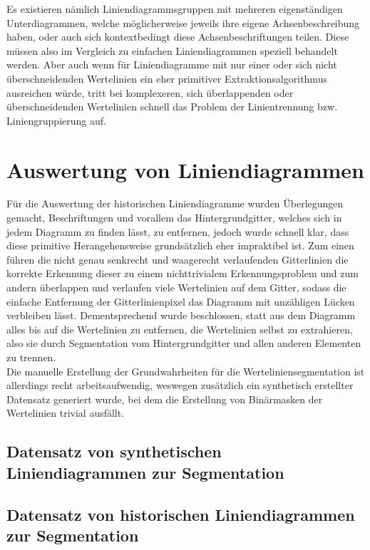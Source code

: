 Es existieren nämlich Liniendiagrammsgruppen mit mehreren eigenständigen Unterdiagrammen, welche möglicherweise jeweils ihre eigene Achsenbeschreibung haben, oder auch sich kontextbedingt diese Achsenbeschriftungen teilen. Diese müssen also im Vergleich zu einfachen Liniendiagrammen speziell behandelt werden. Aber auch wenn für Liniendiagramme mit nur einer oder sich nicht überschneidenden Wertelinien ein eher primitiver Extraktionsalgorithmus ausreichen würde, tritt bei komplexeren, sich überlappenden oder überschneidenden Wertelinien schnell das Problem der Linientrennung bzw. Liniengruppierung auf.

\clearpage

\section{Auswertung von Liniendiagrammen}

Für die Auswertung der historischen Liniendiagramme wurden Überlegungen gemacht, Beschriftungen und vorallem das Hintergrundgitter, welches sich in jedem Diagramm zu finden lässt, zu entfernen, jedoch wurde schnell klar, dass diese primitive Herangehensweise grundsätzlich eher impraktibel ist. Zum einen führen die nicht genau senkrecht und waagerecht verlaufenden Gitterlinien die korrekte Erkennung dieser zu einem nichttrivialem Erkennungsproblem und zum andern überlappen und verlaufen viele Wertelinien auf dem Gitter, sodass die einfache Entfernung der Gitterlinienpixel das Diagramm mit unzähligen Lücken verbleiben lässt. Dementsprechend wurde beschlossen, statt aus dem Diagramm alles bis auf die Wertelinien zu entfernen, die Wertelinien selbst zu extrahieren, also sie durch Segmentation vom Hintergrundgitter und allen anderen Elementen zu trennen.
\\
Die manuelle Erstellung der Grundwahrheiten für die Werteliniensegmentation ist allerdings recht arbeitsaufwendig, weswegen zusätzlich ein synthetisch erstellter Datensatz generiert wurde, bei dem die Erstellung von Binärmasken der Wertelinien trivial ausfällt.

\subsection{Datensatz von synthetischen Liniendiagrammen zur Segmentation}

\subsection{Datensatz von historischen Liniendiagrammen zur Segmentation}